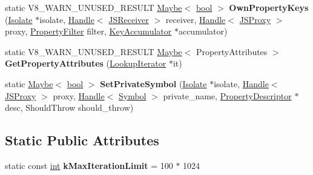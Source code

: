 \begin{DoxyCompactItemize}
static V8\+\_\+\+W\+A\+R\+N\+\_\+\+U\+N\+U\+S\+E\+D\+\_\+\+R\+E\+S\+U\+LT \mbox{\hyperlink{classv8_1_1Maybe}{Maybe}}$<$ \mbox{\hyperlink{classbool}{bool}} $>$ {\bfseries Own\+Property\+Keys} (\mbox{\hyperlink{classv8_1_1internal_1_1Isolate}{Isolate}} $\ast$isolate, \mbox{\hyperlink{classv8_1_1internal_1_1Handle}{Handle}}$<$ \mbox{\hyperlink{classv8_1_1internal_1_1JSReceiver}{J\+S\+Receiver}} $>$ receiver, \mbox{\hyperlink{classv8_1_1internal_1_1Handle}{Handle}}$<$ \mbox{\hyperlink{classv8_1_1internal_1_1JSProxy}{J\+S\+Proxy}} $>$ proxy, \mbox{\hyperlink{namespacev8_afbf02b6b1152a3e25d7bde90798209ac}{Property\+Filter}} filter, \mbox{\hyperlink{classv8_1_1internal_1_1KeyAccumulator}{Key\+Accumulator}} $\ast$accumulator)
\item 
\mbox{\label{classv8_1_1internal_1_1JSProxy_af1bde8c5e31f6829fb57e509bd979a22}} 
static V8\+\_\+\+W\+A\+R\+N\+\_\+\+U\+N\+U\+S\+E\+D\+\_\+\+R\+E\+S\+U\+LT \mbox{\hyperlink{classv8_1_1Maybe}{Maybe}}$<$ Property\+Attributes $>$ {\bfseries Get\+Property\+Attributes} (\mbox{\hyperlink{classv8_1_1internal_1_1LookupIterator}{Lookup\+Iterator}} $\ast$it)
\item 
\mbox{\label{classv8_1_1internal_1_1JSProxy_a8b12f1cf1d7e141960e84b0401150b3e}} 
static \mbox{\hyperlink{classv8_1_1Maybe}{Maybe}}$<$ \mbox{\hyperlink{classbool}{bool}} $>$ {\bfseries Set\+Private\+Symbol} (\mbox{\hyperlink{classv8_1_1internal_1_1Isolate}{Isolate}} $\ast$isolate, \mbox{\hyperlink{classv8_1_1internal_1_1Handle}{Handle}}$<$ \mbox{\hyperlink{classv8_1_1internal_1_1JSProxy}{J\+S\+Proxy}} $>$ proxy, \mbox{\hyperlink{classv8_1_1internal_1_1Handle}{Handle}}$<$ \mbox{\hyperlink{classv8_1_1internal_1_1Symbol}{Symbol}} $>$ private\+\_\+name, \mbox{\hyperlink{classv8_1_1internal_1_1PropertyDescriptor}{Property\+Descriptor}} $\ast$desc, Should\+Throw should\+\_\+throw)
\end{DoxyCompactItemize}
\subsection*{Static Public Attributes}
\begin{DoxyCompactItemize}
\item 
\mbox{\label{classv8_1_1internal_1_1JSProxy_a61af74df2c56dc80fb56df4224b6466e}} 
static const \mbox{\hyperlink{classint}{int}} {\bfseries k\+Max\+Iteration\+Limit} = 100 $\ast$ 1024
\end{DoxyCompactItemize}


